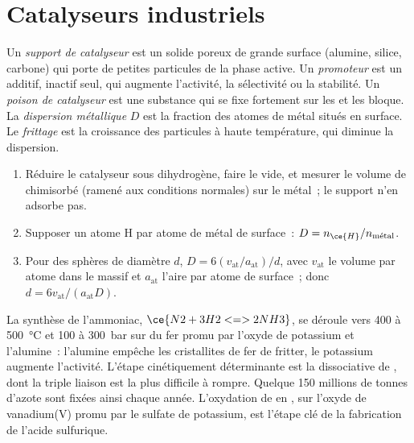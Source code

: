 \section{Catalyseurs industriels}

\begin{definition}\label{def:b3:surfaces-catalysis:catalyst-design}
Un \emph{support de catalyseur} est un solide
poreux de grande surface (alumine, silice, carbone) qui porte de petites
particules de la phase active. Un
\emph{promoteur} est un additif, inactif seul, qui
augmente l'activité, la sélectivité ou la stabilité. Un \emph{poison de
catalyseur} est une substance qui se fixe
fortement sur les  et les bloque.
La \emph{dispersion métallique} $D$ est la fraction des atomes
de métal situés en surface. Le \emph{frittage} est la
croissance des particules à haute température, qui diminue la
dispersion.
\end{definition}

\begin{method}\label{met:b3:surfaces-catalysis:dispersion}
\begin{enumerate}
  \item Réduire le catalyseur sous dihydrogène, faire le vide, et mesurer
        le volume de 
        chimisorbé (ramené aux conditions normales) sur le métal~; le
        support n'en adsorbe pas.
  \item Supposer un atome H par atome de métal de surface~: $D = n_{\ce{H}}/n_{\text{métal}}$.
  \item Pour des sphères de diamètre $d$, $D = 6(v_{\mathrm{at}}/a_{\mathrm{at}})/d$,
        avec $v_{\mathrm{at}}$ le volume par atome dans le
        massif et $a_{\mathrm{at}}$ l'aire par atome de surface~; donc $d = 6v_{\mathrm{at}}/(a_{\mathrm{at}}D)$.
\end{enumerate}
\end{method}

La synthèse de l'ammoniac, $\ce{N2 + 3 H2 <=> 2 NH3}$, se déroule vers
400 à \qty{500}{\celsius} et 100 à
\qty{300}{bar} sur du fer promu par l'oxyde de potassium et l'alumine~:
l'alumine empêche les cristallites de fer de fritter, le potassium
augmente l'activité. L'étape
cinétiquement déterminante est la  dissociative de ,
dont la triple liaison est la plus difficile à rompre. Quelque
150 millions de tonnes d'azote sont fixées ainsi chaque année.
L'oxydation de  en , sur l'oxyde de vanadium(V) promu
par le sulfate de potassium, est l'étape clé de la fabrication de
l'acide sulfurique.

